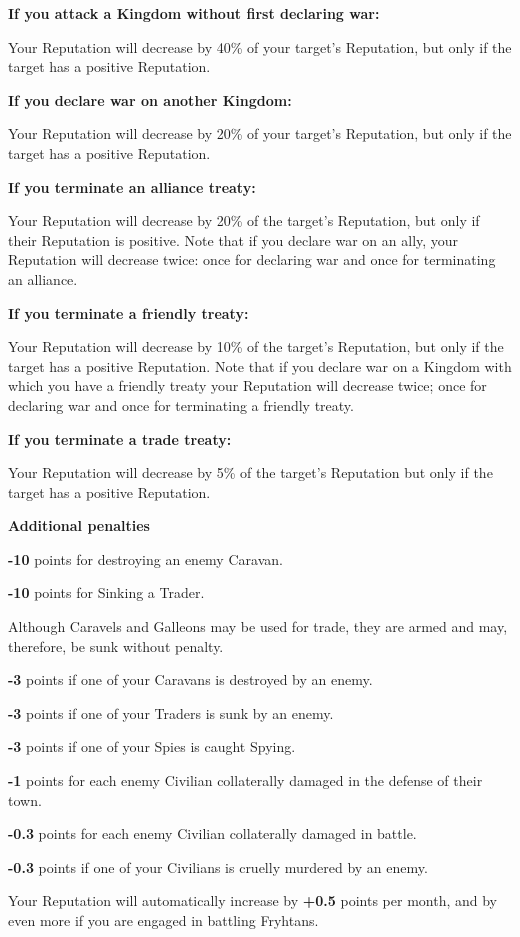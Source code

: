 \begin{changemargin}{.5cm}{0cm}
\textbf{If you attack a Kingdom without first declaring war:}

Your Reputation will decrease by 40\% of your target’s Reputation, but only if the target has a positive Reputation.

\textbf{If you declare war on another Kingdom:}

Your Reputation will decrease by 20\% of your target’s Reputation, but only if the target has a positive Reputation.

\textbf{If you terminate an alliance treaty:}

Your Reputation will decrease by 20\% of the target’s Reputation, but only if their Reputation is positive. Note that if you declare war on an ally, your Reputation will decrease twice: once for declaring war and once for terminating an alliance.

\textbf{If you terminate a friendly treaty:}

Your Reputation will decrease by 10\% of the target’s Reputation, but only if the target has a positive Reputation. Note that if you declare war on a Kingdom with which you have a friendly treaty your Reputation will decrease twice; once for declaring war and once for terminating a friendly treaty.

\textbf{If you terminate a trade treaty:}

Your Reputation will decrease by 5\% of the target’s Reputation but only if the target has a positive Reputation.

\textbf{Additional penalties}

\textbf{-10} points for destroying an enemy Caravan.

\textbf{-10} points for Sinking a Trader.
\end{changemargin}


\begin{changemargin}{1cm}{0cm}
Although Caravels and Galleons may be used for trade, they are armed and may, therefore, be sunk without penalty.
\end{changemargin}

\begin{changemargin}{.5cm}{0cm}
\textbf{-3} points if one of your Caravans is destroyed by an enemy.

\textbf{-3} points if one of your Traders is sunk by an enemy.

\textbf{-3} points if one of your Spies is caught Spying.

\textbf{-1} points for each enemy Civilian collaterally damaged in the defense of their town.

\textbf{-0.3} points for each enemy Civilian collaterally damaged in battle.

\textbf{-0.3} points if one of your Civilians is cruelly murdered by an enemy.

Your Reputation will automatically increase by \textbf{+0.5} points per month, and by even more if you are engaged in battling Fryhtans.
\end{changemargin}

